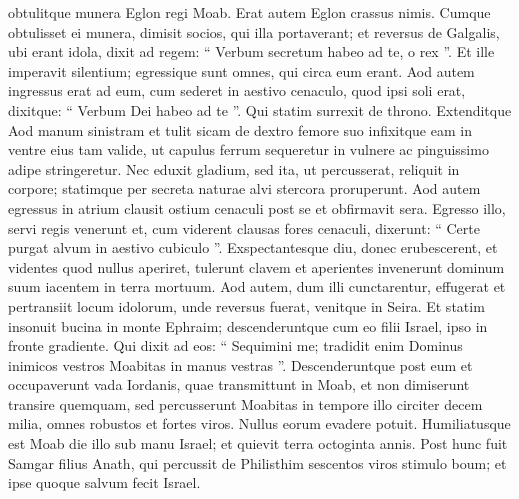\begin{biblechapter}
\begin{biblechapter}
\begin{biblechapter}
\verse obtulitque munera Eglon regi Moab. Erat autem Eglon crassus nimis. 
 \verse Cumque obtulisset ei munera, dimisit socios, qui illa portaverant; 
\verse et reversus de Galgalis, ubi erant idola, dixit ad regem: “ Verbum secretum habeo ad te, o rex ”. Et ille imperavit silentium; egressique sunt omnes, qui circa eum erant. 
\verse Aod autem ingressus erat ad eum, cum sederet in aestivo cenaculo, quod ipsi soli erat, dixitque: “ Verbum Dei habeo ad te ”. Qui statim surrexit de throno. 
\verse Extenditque Aod manum sinistram et tulit sicam de dextro femore suo infixitque eam in ventre eius 
\verse tam valide, ut capulus ferrum sequeretur in vulnere ac pinguissimo adipe stringeretur. Nec eduxit gladium, sed ita, ut percusserat, reliquit in corpore; statimque per secreta naturae alvi stercora proruperunt. 
\verse Aod autem egressus in atrium clausit ostium cenaculi post se et obfirmavit sera. 
\verse Egresso illo, servi regis venerunt et, cum viderent clausas fores cenaculi, dixerunt: “ Certe purgat alvum in aestivo cubiculo ”. 
\verse Exspectantesque diu, donec erubescerent, et videntes quod nullus aperiret, tulerunt clavem et aperientes invenerunt dominum suum iacentem in terra mortuum.
 \verse Aod autem, dum illi cunctarentur, effugerat et pertransiit locum idolorum, unde reversus fuerat, venitque in Seira. 
\verse Et statim insonuit bucina in monte Ephraim; descenderuntque cum eo filii Israel, ipso in fronte gradiente. 
 \verse Qui dixit ad eos: “ Sequimini me; tradidit enim Dominus inimicos vestros Moabitas in manus vestras ”. Descenderuntque post eum et occupaverunt vada Iordanis, quae transmittunt in Moab, et non dimiserunt transire quemquam, 
\verse sed percusserunt Moabitas in tempore illo circiter decem milia, omnes robustos et fortes viros. Nullus eorum evadere potuit. 
\verse Humiliatusque est Moab die illo sub manu Israel; et quievit terra octoginta annis.
 \verse Post hunc fuit Samgar filius Anath, qui percussit de Philisthim sescentos viros stimulo boum; et ipse quoque salvum fecit Israel.
 

\end{biblechapter}
\end{biblechapter}
\end{biblechapter}
